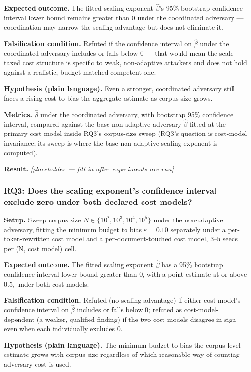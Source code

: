 \documentclass[11pt]{article}
\newcommand{\ph}{\textit{[placeholder --- fill in after experiments are run]}}
\begin{document}
\textbf{Expected outcome.} The fitted scaling exponent $\hat\beta$'s 95\% bootstrap confidence interval lower bound remains greater than 0 under the coordinated adversary --- coordination may narrow the scaling advantage but does not eliminate it.

\textbf{Falsification condition.} Refuted if the confidence interval on $\hat\beta$ under the coordinated adversary includes or falls below 0 --- that would mean the scale-taxed cost structure is specific to weak, non-adaptive attackers and does not hold against a realistic, budget-matched competent one.

\textbf{Hypothesis (plain language).} Even a stronger, coordinated adversary still faces a rising cost to bias the aggregate estimate as corpus size grows.

\textbf{Metrics.} $\hat\beta$ under the coordinated adversary, with bootstrap 95\% confidence interval, compared against the base non-adaptive-adversary $\hat\beta$ fitted at the primary cost model inside RQ3's corpus-size sweep (RQ3's question is cost-model invariance; its sweep is where the base non-adaptive scaling exponent is computed).

\textbf{Result.} \ph

\subsubsection{RQ3: Does the scaling exponent's confidence interval exclude zero under both declared cost models?}
\textbf{Setup.} Sweep corpus size $N \in \{10^2, 10^3, 10^4, 10^5\}$ under the non-adaptive adversary, fitting the minimum budget to bias $\varepsilon = 0.10$ separately under a per-token-rewritten cost model and a per-document-touched cost model, 3--5 seeds per (N, cost model) cell.

\textbf{Expected outcome.} The fitted scaling exponent $\hat\beta$ has a 95\% bootstrap confidence interval lower bound greater than 0, with a point estimate at or above 0.5, under both cost models.

\textbf{Falsification condition.} Refuted (no scaling advantage) if either cost model's confidence interval on $\hat\beta$ includes or falls below 0; refuted as cost-model-dependent (a weaker, qualified finding) if the two cost models disagree in sign even when each individually excludes 0.

\textbf{Hypothesis (plain language).} The minimum budget to bias the corpus-level estimate grows with corpus size regardless of which reasonable way of counting adversary cost is used.
\end{document}
